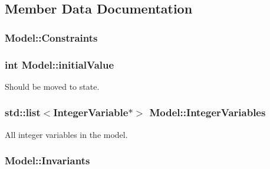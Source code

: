 \subsection{Member Data Documentation}
\hypertarget{class_model_aca46427b888eb4564749efc4a305ec50}{
\subsubsection[{Constraints}]{ Model\-::\-Constraints\hspace{0.3cm}{\ttfamily [private]}}}\label{class_model_aca46427b888eb4564749efc4a305ec50}
\hypertarget{class_model_a69256596942801e8a166dabaf9a31114}{
\subsubsection[{initial\-Value}]{\setlength{\rightskip}{0pt plus 5cm}int Model\-::initial\-Value}}\label{class_model_a69256596942801e8a166dabaf9a31114}


Should be moved to state. 

\hypertarget{class_model_a64bcd8c173f44f76e0217fdcbf92d8eb}{
\subsubsection[{Integer\-Variables}]{\setlength{\rightskip}{0pt plus 5cm}std\-::list$<${\bf Integer\-Variable}$\ast$$>$ Model\-::\-Integer\-Variables\hspace{0.3cm}{\ttfamily [private]}}}\label{class_model_a64bcd8c173f44f76e0217fdcbf92d8eb}


All integer variables in the model. 

\hypertarget{class_model_a7523e3ea7a5c057d7570dbf7b1cfc9b5}{
\subsubsection[{Invariants}]{ Model\-::\-Invariants\hspace{0.3cm}{\ttfamily [private]}}}\label{class_model_a7523e3ea7a5c057d7570dbf7b1cfc9b5}


